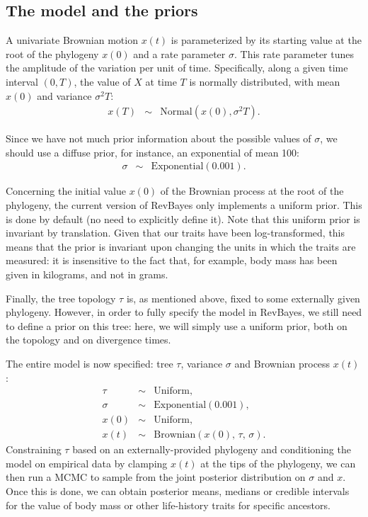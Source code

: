 \documentclass[usletter]{article}
\begin{document}
\subsection*{The model and the priors}

A univariate Brownian motion $x(t)$ is parameterized by its starting value at the root of the phylogeny $x(0)$ and a rate parameter $\sigma$. This rate parameter tunes the amplitude of the variation per unit of time. Specifically, along a given time interval $(0,T)$, the value of $X$ at time $T$ is normally distributed, with mean $x(0)$ and variance $\sigma^2 T$:
\begin{eqnarray*}
x(T) &\sim& \text{Normal} \left( x(0), \sigma^2 T \right).
\end{eqnarray*}

Since we have not much prior information about the possible values of $\sigma$, we should use a diffuse prior, for instance, an exponential of mean 100:
\begin{eqnarray*}
\sigma &\sim& \text{Exponential}(0.001).
\end{eqnarray*}

Concerning the initial value $x(0)$ of the Brownian process at the root of the phylogeny,
the current version of RevBayes only implements a uniform prior.
This is done by default (no need to explicitly define it).
Note that this uniform prior is invariant by translation. Given that our traits have been log-transformed, this means that the prior is invariant upon changing the units in which the traits are measured: it is insensitive to the fact that, for example, body mass has been given in kilograms, and not in grams.

Finally, the tree topology $\tau$ is, as mentioned above, fixed to some externally given phylogeny. However, in order to fully specify the model in RevBayes, we still need to define a prior on this tree: here, we will simply use a uniform prior, both on the topology and on divergence times.

The entire model is now specified: tree $\tau$, variance $\sigma$ and Brownian process $x(t)$:
\begin{eqnarray*}
\tau &\sim& \text{Uniform},
\\
\sigma &\sim& \text{Exponential}(0.001),
\\
x(0) &\sim& \text{Uniform},
\\
x(t) &\sim& \text{Brownian} \left( x(0), \, \tau, \, \sigma \right).
\end{eqnarray*}
Constraining $\tau$ based on an externally-provided phylogeny and conditioning the model on empirical data by clamping $x(t)$ at the tips of the phylogeny, we can then run a MCMC to sample from the joint posterior distribution on $\sigma$ and $x$. Once this is done, we can obtain posterior means, medians or credible intervals for the value of body mass or other life-history traits for specific ancestors.
\end{document}

